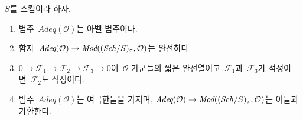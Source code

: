 \begin{lemma}
\label{lemma-abelian-adequate}
$S$를 스킴이라 하자.
\begin{enumerate}
\item 범주\  $\textit{Adeq}(\mathcal{O})$는 아벨 범주이다.
\item 함자\ 
$\textit{Adeq}(\mathcal{O}) \to
\textit{Mod}((\mathit{Sch}/S)_\tau, \mathcal{O})$는 완전하다.
\item $0 \to \mathcal{F}_1 \to \mathcal{F}_2 \to \mathcal{F}_3 \to 0$이\ 
$\mathcal{O}$-가군들의 짧은 완전열이고\  $\mathcal{F}_1$과\ 
$\mathcal{F}_3$가 적정이면\  $\mathcal{F}_2$도 적정이다.
\item 범주\  $\textit{Adeq}(\mathcal{O})$는 여극한들을 가지며,
$\textit{Adeq}(\mathcal{O}) \to
\textit{Mod}((\mathit{Sch}/S)_\tau, \mathcal{O})$는 이들과 가환한다.
\end{enumerate}
\end{lemma}

